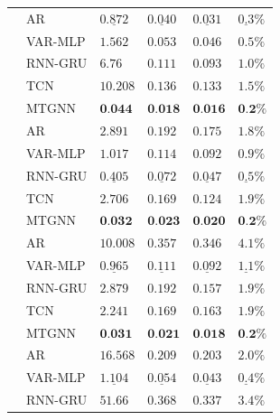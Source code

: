 \begin{table}[bt]
{\begin{tabular}{ *6l }
    \midrule
     & AR & $\underline{0.872}$ & $\underline{0.040}$ & $\underline{0.031}$ & $\underline{0.3}\%$\\
    & VAR-MLP & $1.562$ & $0.053$ & $0.046$ & $0.5\%$ \\
    & RNN-GRU & $6.76$ & $0.111$ & $0.093$ & $1.0\%$\\
    & TCN & $10.208$ & $0.136$ & $0.133$ & $1.5\%$\\
    & MTGNN & $\textbf{0.044}$ & $\textbf{0.018}$ & $\textbf{0.016}$ & $\textbf{0.2}\%$\\
    \midrule
     & AR & $2.891$ & $0.192$ & $0.175$ & $1.8\%$ \\
    & VAR-MLP & $1.017$ & $0.114$ & $0.092$ & $0.9\%$ \\
    & RNN-GRU & $\underline{0.405}$ & $\underline{0.072}$ & $\underline{0.047}$ & $\underline{0.5}\%$\\ 
    & TCN & $2.706$ & $0.169$ & $0.124$ & $1.9\%$\\
    & MTGNN & $\textbf{0.032}$ & $\textbf{0.023}$ & $\textbf{0.020}$ & $\textbf{0.2}\%$\\
    \midrule
     & AR & $10.008$ & $0.357$ & $0.346$ & $4.1\%$ \\
    & VAR-MLP & $\underline{0.965}$ & $\underline{0.111}$ & $\underline{0.092}$ & $\underline{1.1}\%$ \\
    & RNN-GRU & $2.879$ & $0.192$ & $0.157$ & $1.9\%$\\
    & TCN & $2.241$ & $0.169$ & $0.163$ & $1.9\%$ \\
    & MTGNN & $\textbf{0.031}$ & $\textbf{0.021}$ & $\textbf{0.018}$ & $\textbf{0.2}\%$\\
    \midrule
    & AR & $16.568$ & $0.209$ & $0.203$ & $2.0\%$ \\
    & VAR-MLP & $\underline{1.104}$ & $\underline{0.054}$ & $\underline{0.043}$ & $\underline{0.4}\%$ \\
    & RNN-GRU & $51.66$ & $0.368$ & $0.337$ & $3.4\%$\\

\end{tabular}}
\end{table}
